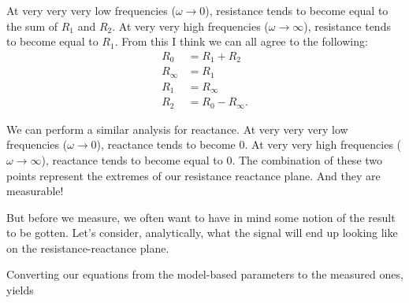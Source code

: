 \documentclass[11pt]{book}
\begin{document}
At very very very low frequencies ($\omega \rightarrow 0$), resistance tends to become equal to the sum of $R_1$ and $R_2$. At very very high frequencies ($\omega \rightarrow \infty$), resistance tends to become equal to $R_1$. From this I think we can all agree to the following:
\begin{align}
	R_0 &= R_1 + R_2 \\
	R_{\infty} &= R_1 \\
	R_1 &= R_{\infty} \\
	R_2 &= R_0 - R_{\infty}.
\end{align}

We can perform a similar analysis for reactance. At very very very low frequencies ($\omega \rightarrow 0$), reactance tends to become 0. At very very high frequencies ($\omega \rightarrow \infty$), reactance tends to become equal to 0. The combination of these two points represent the extremes of our resistance reactance plane. And they are measurable!

But before we measure, we often want to have in mind some notion of the result to be gotten. Let's consider, analytically, what the signal will end up looking like on the resistance-reactance plane.

Converting our equations from the model-based parameters to the measured ones, yields
\end{document}

